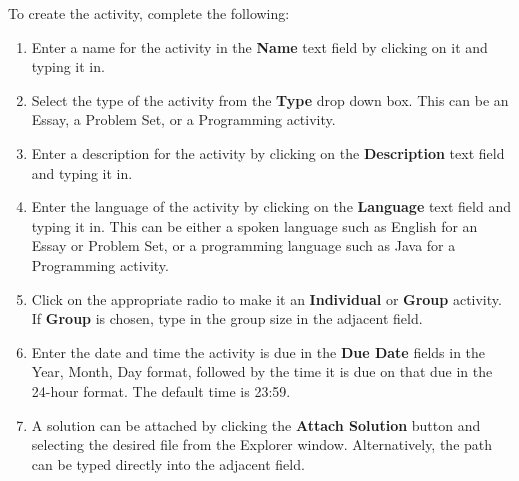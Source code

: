 \documentclass{article}
\begin{document}
\begin{enumerate}
\begin{center}
   \label{newActivity}
  \end{center}
  To create the activity, complete the following:
  \begin{enumerate}
  \item Enter a name for the activity in the \textbf{Name} text field by clicking on 
  it and typing it in.
  \item Select the type of the activity from the \textbf{Type} drop down box.
  This can be an Essay, a Problem Set, or a Programming activity.
  \item Enter a description for the activity by clicking on the \textbf{Description} 
  text field and typing it in.
  \item Enter the language of the activity by clicking on the \textbf{Language} text
  field and typing it in. This can be either a spoken language such as English 
  for an Essay or Problem Set, or a programming language such as Java for a Programming
  activity.
  \item Click on the appropriate radio to make it an \textbf{Individual} or 
  \textbf{Group} activity. If \textbf{Group} is chosen, type in the group size in the 
  adjacent field.
  \item Enter the date and time the activity is due in the \textbf{Due Date} fields 
  in the Year, Month, Day format, followed by the time it is due on that due in
  the 24-hour format. The default time is 23:59.
  \item A solution can be attached by clicking the \textbf{Attach Solution} button and 
  selecting the desired file from the Explorer window. Alternatively, the path can be 
  typed directly into the adjacent field.
  

\end{enumerate}
\end{enumerate}
\end{document}
